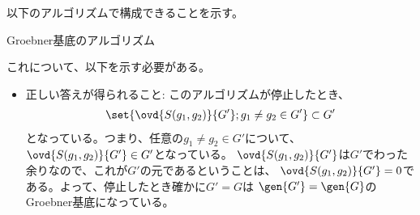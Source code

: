 \begin{myproof}
  以下のアルゴリズムで構成できることを示す。
\begin{algorithm}[H]
  \caption{Groebner基底のアルゴリズム}
  \begin{algorithmic}[1]
    \REPEAT{}
  \end{algorithmic}
\end{algorithm}
これについて、以下を示す必要がある。
\begin{itemize}
  \item 正しい答えが得られること:
  このアルゴリズムが停止したとき、
  \begin{align}
    \set{\ovd{S(g_1,g_2)}{G'} ; g_1 \neq g_2 \in G'} \subset G'
  \end{align}
  となっている。つまり、任意の$g_1\neq g_2 \in G'$について、
  $\ovd{S(g_1,g_2)}{G'}\in G'$となっている。
  $\ovd{S(g_1,g_2)}{G'}$は$G'$でわった余りなので、これが$G'$の元であるということは、
  $\ovd{S(g_1,g_2)}{G'} = 0$である。よって、停止したとき確かに$G'=G$は
  $\gen{G'}=\gen{G}$のGroebner基底になっている。


\end{itemize}
\end{myproof}
